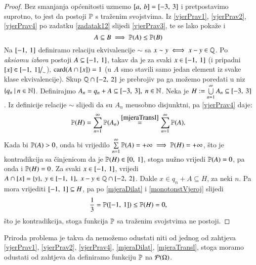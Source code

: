 \begin{proof}
    Bez smanjanja op\' cenitosti uzmemo $[{a}, \:{b}]
    = [{-3}, \:{3}]$ i pretpostavimo suprotno, to jest da postoji
    $\mathbb{P}$ s tra\v zenim svojstvima. Iz \eqref{vjerPrav1},
    \eqref{vjerPrav2}, \eqref{vjerPrav4} po zadatku \ref{zadatak12}
    slijedi \eqref{vjerPrav3}, te se lako poka\v ze i
    \begin{equation} \label{monotonstVjeroj}
        A \subseteq B \implies \mathbb{P}({A}) \leq \mathbb{P}({B})
    \end{equation}
    Na $[{-1}, \:{1}]$ definiramo relaciju ekvivalencije $\sim$
    sa $x \sim y \iff x - y \in \mathbb{Q}$. Po \emph{aksiomu izbora} postoji
    $A \subseteq [{-1}, \:{1}]$, takav da je za svaki $x \in
    [{-1}, \:{1}]$ (i pripadni $[x] \in [{-1}, \:{1}] \big/
    _{\sim}$), $\textnormal{card}({A \cap [x]}) = 1$ (u $A$ smo stavili samo jedan
    element iz svake klase ekvivalencije).
    Skup $\mathbb{Q} \cap [{-2}, \:{2}]$ je prebrojiv pa ga mo\v zemo
    poredati u niz $\{ q_n \: | \: n \in \mathbb{N} \}$.
    Definirajmo $A_n = q_n + A \subseteq [{-3}, \:{3}], \; n \in
    \mathbb{N}$. Neka je $H := \bigcup\limits_{n=1}^{\infty} A_n \subseteq
    [{-3}, \:{3}]$. 
    Iz definicije relacije $\sim$ slijedi da su $A_n$ me\dj usobno
    disjunktni, pa \eqref{vjerPrav4} daje:
    \begin{equation*}
        \mathbb{P}({H}) = \sum\limits_{n=1}^{\infty} \mathbb{P}({A_n})
            \overset{\eqref{mjeraTransl}}{=} \sum\limits_{n=1}^{\infty}
            \mathbb{P}({A}).
    \end{equation*}
    Kada bi $\mathbb{P}({A}) > 0$, onda bi vrijedilo $\sum\limits_{n=1}^{\infty}
    \mathbb{P}({A}) = + \infty \implies \mathbb{P}({H}) = +\infty$, \v sto je
    kontradikcija sa \v cinjenicom da je $\mathbb{P}({H}) \in
    [{0}, \:{1}]$, stoga nu\v zno vrijedi $\mathbb{P}({A}) = 0$, pa onda
    i $\mathbb{P}({H}) = 0$.
    Za svaki $x \in [{-1}, \:{1}]$, vrijedi $A \cap [x] = \{y\},
    \; y \in [{-1}, \:{1}], \; x - y \in \mathbb{Q} \cap [{-2}, \:{2}]$.
    Dakle $x \in q_n + A \subseteq H$, za neki $n$. Pa mora vrijediti
    $[{-1}, \:{1}] \subseteq H$, pa po \eqref{mjeraDilat} i
    \eqref{monotonstVjeroj} slijedi
    \begin{equation*}
        \frac{1}{3} = \mathbb{P}({[{-1}, \:{1}]}) \leq \mathbb{P}({H}) = 0,
    \end{equation*}
    \v sto je kontradikcija, stoga funkcija $\mathbb{P}$ sa tra\v zenim
    svojstvima ne postoji.
\end{proof}

Priroda problema je takva da nemo\v zemo odustati niti od jednog od
zahtjeva \eqref{vjerPrav1}, \eqref{vjerPrav2}, \eqref{vjerPrav4},
\eqref{mjeraDilat}, \eqref{mjeraTransl}, stoga moramo odustati od
zahtjeva da definiramo funkciju $\mathbb{P}$ na $\mathcal{P}({\Omega})$.


